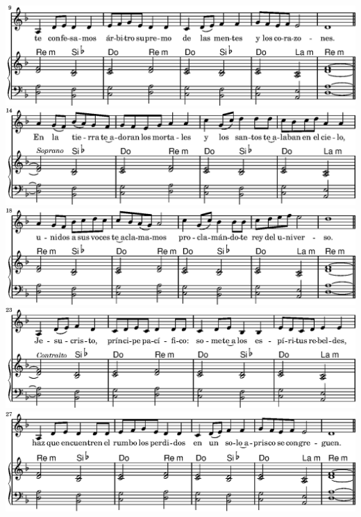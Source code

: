 \else
  \expandafter{}%
\fi
\includegraphics{05/lily-8a2afe59-7}%
\ifx\betweenLilyPondSystem \undefined
  \linebreak
\else
  \expandafter{}%
\fi
\includegraphics{05/lily-8a2afe59-8}%
\ifx\betweenLilyPondSystem \undefined
  \linebreak
\else
  \expandafter{}%
\fi
\includegraphics{05/lily-8a2afe59-9}%
\ifx\betweenLilyPondSystem \undefined
  \linebreak
\else
  \expandafter{}%
\fi
\includegraphics{05/lily-8a2afe59-10}%
\ifx\betweenLilyPondSystem \undefined
  \linebreak
\else
  \expandafter{}%
\fi
\includegraphics{05/lily-8a2afe59-11}%
